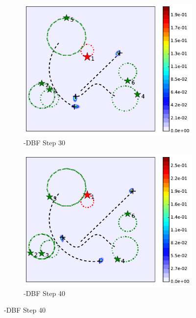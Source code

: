 \begin{figure}
\begin{subfigure}[b]{0.23\textwidth}
			\includegraphics[width=\textwidth]{figures/hetero_mov_sen_mov_tar_rbt1_step30}
			\caption{\proto-DBF Step 30}\label{fig:step30}
		\end{subfigure}
		\begin{subfigure}[b]{0.23\textwidth}
			\includegraphics[width=\textwidth]{figures/hetero_mov_sen_mov_tar_rbt1_step40}
			\caption{\proto-DBF Step 40}\label{fig:step40}
		\end{subfigure}	

\end{figure}
